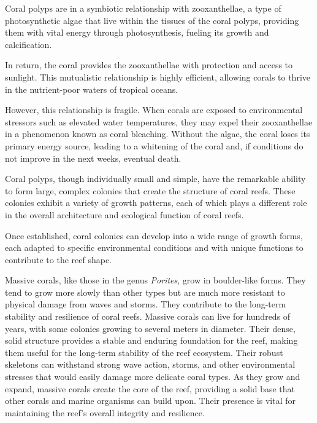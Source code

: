 Coral polyps are in a symbiotic relationship with zooxanthellae, a type of photosynthetic algae that live within the tissues of the coral polyps, providing them with vital energy through photosynthesis, fueling its growth and calcification.

In return, the coral provides the zooxanthellae with protection and access to sunlight. This mutualistic relationship is highly efficient, allowing corals to thrive in the nutrient-poor waters of tropical oceans.

However, this relationship is fragile. When corals are exposed to environmental stressors such as elevated water temperatures, they may expel their zooxanthellae in a phenomenon known as coral bleaching. Without the algae, the coral loses its primary energy source, leading to a whitening of the coral and, if conditions do not improve in the next weeks, eventual death.

Coral polyps, though individually small and simple, have the remarkable ability to form large, complex colonies that create the structure of coral reefs. These colonies exhibit a variety of growth patterns, each of which plays a different role in the overall architecture and ecological function of coral reefs.

Once established, coral colonies can develop into a wide range of growth forms, each adapted to specific environmental conditions and with unique functions to contribute to the reef shape.

Massive corals, like those in the genus \textit{Porites}, grow in boulder-like forms. They tend to grow more slowly than other types but are much more resistant to physical damage from waves and storms. They contribute to the long-term stability and resilience of coral reefs. Massive corals can live for hundreds of years, with some colonies growing to several meters in diameter. Their dense, solid structure provides a stable and enduring foundation for the reef, making them useful for the long-term stability of the reef ecosystem. Their robust skeletons can withstand strong wave action, storms, and other environmental stresses that would easily damage more delicate coral types. As they grow and expand, massive corals create the core of the reef, providing a solid base that other corals and marine organisms can build upon. Their presence is vital for maintaining the reef's overall integrity and resilience.

